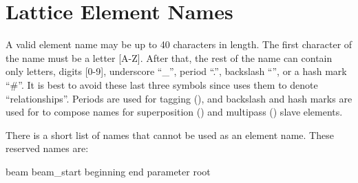 \section{Lattice Element Names}
\label{s:ele.names}

A valid element name may be up to 40 characters in length. The first
character of the name must be a letter [A-Z]. After that, the rest of
the name can contain only letters, digits [0-9], underscore ``_'',
period ``.'', backslash ``\B'', or a hash mark ``\#''. It is best to
avoid these last three symbols since \bmad uses them to denote
``relationships''.  Periods are used for tagging (), and
backslash and hash marks are used for to compose names for
superposition () and multipass ()
slave elements.

There is a short list of names that cannot be used as an element name. 
These reserved names are:
\begin{example}
  beam
  beam_start
  beginning
  end
  parameter
  root
\end{example}

